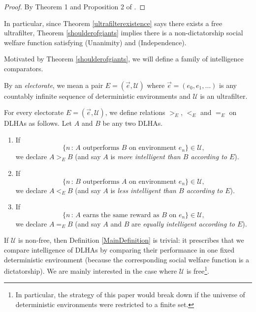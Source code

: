\documentclass[twoside,11pt]{article}
\begin{document}
\begin{proof}
    By Theorem 1 and Proposition 2 of \citet{kirman}.
\end{proof}

In particular, since Theorem \ref{ultrafilterexistence} says there exists a free
ultrafilter, Theorem \ref{shoulderofgiants} implies there is a non-dictatorship
social welfare function satisfying (Unanimity) and (Independence).

Motivated by Theorem \ref{shoulderofgiants}, we will define a family of intelligence
comparators.

\begin{definition}
    By an \emph{electorate}, we mean a
    pair $E=(\vec{e}, \mathscr U)$ where
    $\vec{e}=(e_0,e_1,\ldots)$ is any countably infinite sequence of deterministic environments
    and $\mathscr U$ is an ultrafilter.
\end{definition}

\begin{definition}
\label{MainDefinition}
    For every electorate $E=(\vec{e},\mathscr U)$,
    we define relations $>_{E}$, $<_{E}$ and $=_{E}$ on DLHAs as follows.
    Let $A$ and $B$ be any two DLHAs.
    \begin{enumerate}
        \item
        If
        \[
            \{n\,:\,\mbox{$A$ outperforms $B$ on environment $e_n$}\}\in\mathscr U,
        \]
        we declare $A>_{E}B$
        (and say $A$ is \emph{more intelligent than $B$ according to $E$}).
        \item
        If
        \[
            \{n\,:\,\mbox{$B$ outperforms $A$ on environment $e_n$}\}\in\mathscr U,
        \]
        we declare $A<_{E}B$
        (and say $A$ is \emph{less intelligent than $B$ according to $E$}).
        \item
        If
        \[
            \{n\,:\,\mbox{$A$ earns the same reward as $B$ on $e_n$}\}\in\mathscr U,
        \]
        we declare $A=_{E}B$
        (and say $A$ and $B$ are \emph{equally intelligent according to $E$}).
    \end{enumerate}
\end{definition}

If $\mathscr U$ is non-free, then Definition \ref{MainDefinition} is trivial:
it prescribes that we compare intelligence of DLHAs by comparing their
performance in one fixed deterministic environment (because the corresponding social welfare
function is a dictatorship). We are mainly interested in the case where $\mathscr U$
is free\footnote{In particular, the strategy of this paper would break
down if the universe of deterministic environments were restricted to a finite set.}.
\end{document}
